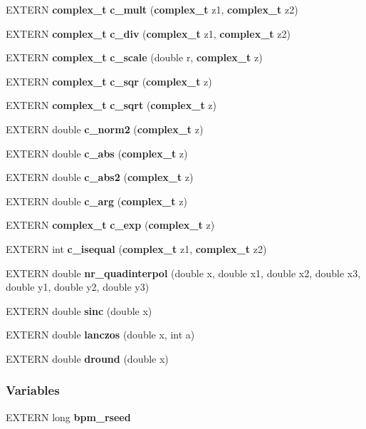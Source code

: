 \begin{CompactItemize}
\item 
EXTERN {\bf complex\_\-t} \textbf{c\_\-mult} ({\bf complex\_\-t} z1, {\bf complex\_\-t} z2)\label{group__nr_gbac492f503bff737e6a11c03e44e7ada}

\item 
EXTERN {\bf complex\_\-t} \textbf{c\_\-div} ({\bf complex\_\-t} z1, {\bf complex\_\-t} z2)\label{group__nr_g3cb3d7ddec167a30a5f7a159dea26c0f}

\item 
EXTERN {\bf complex\_\-t} \textbf{c\_\-scale} (double r, {\bf complex\_\-t} z)\label{group__nr_g4a8c814a8cb7b92c919b23e1ea64d615}

\item 
EXTERN {\bf complex\_\-t} \textbf{c\_\-sqr} ({\bf complex\_\-t} z)\label{group__nr_g72516630e1d745f5d1630b4c525cb5f8}

\item 
EXTERN {\bf complex\_\-t} \textbf{c\_\-sqrt} ({\bf complex\_\-t} z)\label{group__nr_g22d2bd8775120d34e3b700682e67d955}

\item 
EXTERN double \textbf{c\_\-norm2} ({\bf complex\_\-t} z)\label{group__nr_g98f394b1ddccfeb4d9b5edb6c1f8c652}

\item 
EXTERN double \textbf{c\_\-abs} ({\bf complex\_\-t} z)\label{group__nr_gdd54790aa13824ee1db3d0558a465071}

\item 
EXTERN double \textbf{c\_\-abs2} ({\bf complex\_\-t} z)\label{group__nr_g5a31b290dd721358e4270d9686347dde}

\item 
EXTERN double \textbf{c\_\-arg} ({\bf complex\_\-t} z)\label{group__nr_g5a8776cef7d6ef88a11015d6ec2665ba}

\item 
EXTERN {\bf complex\_\-t} \textbf{c\_\-exp} ({\bf complex\_\-t} z)\label{group__nr_g41a40da9e1d42de8e76d999abd476f8a}

\item 
EXTERN int \textbf{c\_\-isequal} ({\bf complex\_\-t} z1, {\bf complex\_\-t} z2)\label{group__nr_gd3e4d63450915ff27b8e506acb21bb2e}

\item 
EXTERN double {\bf nr\_\-quadinterpol} (double x, double x1, double x2, double x3, double y1, double y2, double y3)
\item 
EXTERN double {\bf sinc} (double x)
\item 
EXTERN double {\bf lanczos} (double x, int a)
\item 
EXTERN double {\bf dround} (double x)
\end{CompactItemize}
\subsubsection*{Variables}
\begin{CompactItemize}
\item 
EXTERN long \textbf{bpm\_\-rseed}\label{group__nr_ga0d31375f4ee67d90ba46fbda872d25c}

\end{CompactItemize}
